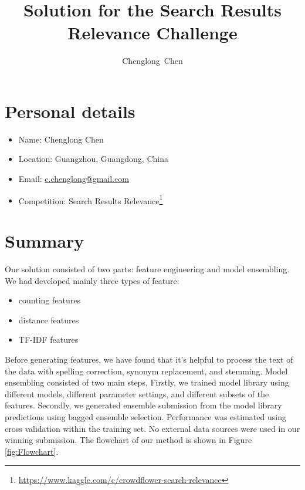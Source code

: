 \documentclass[12pt]{article}
\begin{document}
\title{Solution for the Search Results Relevance Challenge}
\author{Chenglong~Chen}
\maketitle


\section*{Personal details}
\begin{itemize}
\item Name: Chenglong Chen
\item Location: Guangzhou, Guangdong, China
\item Email: \url{c.chenglong@gmail.com}
\item Competition: Search Results Relevance\footnote{\url{https://www.kaggle.com/c/crowdflower-search-relevance}}
\end{itemize}

\newpage
\tableofcontents

\newpage
\section{Summary}
Our solution consisted of two parts: feature engineering and model ensembling. We had developed mainly three types of feature:
\begin{itemize}
\item counting features
\item distance features
\item TF-IDF features
\end{itemize}
Before generating features, we have found that it's helpful to process the text of the data with spelling correction, synonym replacement, and stemming. Model ensembling consisted of two main steps, Firstly, we trained model library using different models, different parameter settings, and different subsets of the features. Secondly, we generated ensemble submission from the model library predictions using bagged ensemble selection. Performance was estimated using cross validation within the training set. No external data sources were used in our winning submission. The flowchart of our method is shown in Figure \ref{fig:Flowchart}.
\end{document}
